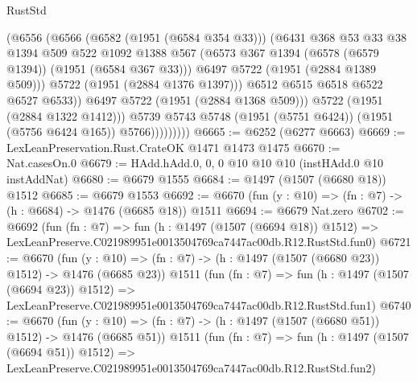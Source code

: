 \begin{lexlean}{RustStd}
\begin{coremodule}
                            (@6556
                              (@6566
                                (@6582 (@1951 (@6584 @354 @33)))
                                (@6431
                                  @368
                                  @53
                                  @33
                                  @38
                                  @1394
                                  @509
                                  @522
                                  @1092
                                  @1388
                                  @567
                                  (@6573 @367 @1394 (@6578 (@6579 @1394)) (@1951 (@6584 @367 @33)))
                                  @6497
                                  @5722
                                  (@1951 (@2884 @1389 @509)))
                                @5722
                                (@1951 (@2884 @1376 @1397)))
                              @6512
                              @6515
                              @6518
                              @6522
                              @6527
                              @6533))
                          @6497
                          @5722
                          (@1951 (@2884 @1368 @509)))
                        @5722
                        (@1951 (@2884 @1322 @1412)))
                      @5739
                      @5743
                      @5748
                      (@1951 (@5751 @6424))
                      (@1951 (@5756 @6424 @165))
                      @5766)))))))))
@6665 := @6252 (@6277 @6663)
@6669 := LexLeanPreservation.Rust.CrateOK @1471 @1473 @1475
@6670 := Nat.casesOn.{0}
@6679 := HAdd.hAdd.{0, 0, 0} @10 @10 @10 (instHAdd.{0} @10 instAddNat)
@6680 := @6679 @1555
@6684 := @1497 (@1507 (@6680 @18)) @1512
@6685 := @6679 @1553
@6692 := @6670 (fun (y : @10) => (fn : @7) -> (h : @6684) -> @1476 (@6685 @18)) @1511
@6694 := @6679 Nat.zero
@6702 := @6692
    (fun (fn : @7) =>
    fun (h : @1497 (@1507 (@6694 @18)) @1512) =>
    LexLeanPreserve.C021989951e0013504769ca7447ac00db.R12.RustStd.fun0)
@6721 := @6670
    (fun (y : @10) => (fn : @7) -> (h : @1497 (@1507 (@6680 @23)) @1512) -> @1476 (@6685 @23))
    @1511
    (fun (fn : @7) =>
    fun (h : @1497 (@1507 (@6694 @23)) @1512) =>
    LexLeanPreserve.C021989951e0013504769ca7447ac00db.R12.RustStd.fun1)
@6740 := @6670
    (fun (y : @10) => (fn : @7) -> (h : @1497 (@1507 (@6680 @51)) @1512) -> @1476 (@6685 @51))
    @1511
    (fun (fn : @7) =>
    fun (h : @1497 (@1507 (@6694 @51)) @1512) =>
    LexLeanPreserve.C021989951e0013504769ca7447ac00db.R12.RustStd.fun2)

\end{coremodule}
\end{lexlean}
